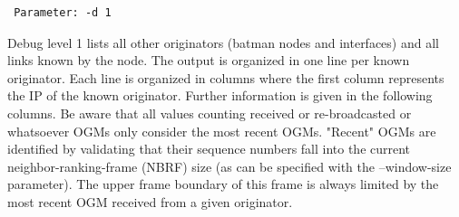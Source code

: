 \documentclass[11pt]{article}
\begin{document}
\label{sec:debug-level-1}

\begin{small}
\begin{verbatim}
 Parameter: -d 1
\end{verbatim}
\end{small}

Debug level 1 lists all other originators (batman nodes and interfaces) and all links known by the node. 
%
The output is organized in one line per known originator. Each line is organized in columns where the first column represents the IP of the known originator. Further information is given in the following columns.
%
Be aware that all values counting received or re-broadcasted or whatsoever OGMs only consider the most recent OGMs. "Recent" OGMs are identified by validating that their sequence numbers fall into the current neighbor-ranking-frame (NBRF) size (as can be specified with the --window-size parameter). The upper frame boundary of this frame is always limited by the most recent OGM received from a given originator.
\end{document}
